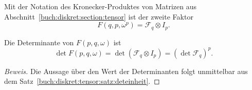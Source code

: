 Mit der Notation des Kronecker-Produktes von Matrizen aus
Abschnitt~\ref{buch:diskret:section:tensor} ist der zweite Faktor
\[
F(q,p,\omega^p)
=
\mathscr{F}_q
\otimes
I_p.
\]

\begin{satz}
Die Determinante von $F(p,q,\omega)$
ist
\[
\det F(p,q,\omega)
=
\det(
\mathscr{F}_q
\otimes
I_p
)
=
(\det \mathscr{F}_q)^p.
\]
\end{satz}

\begin{proof}[Beweis]
Die Aussage über den Wert der Determinanten folgt unmittelbar aus
dem Satz~\ref{buch:diskret:tensor:satz:deteinheit}.
\end{proof}

